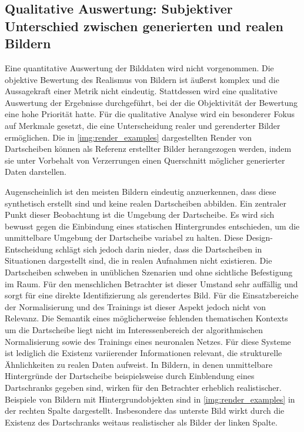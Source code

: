 \subsection[Qualitative Auswertung]{Qualitative Auswertung: Subjektiver Unterschied zwischen generierten und realen Bildern}  %
\label{sec:rendering_qualitativ}

Eine quantitative Auswertung der Bilddaten wird nicht vorgenommen. Die objektive Bewertung des Realismus von Bildern ist äußerst komplex und die Aussagekraft einer Metrik nicht eindeutig. Stattdessen wird eine qualitative Auswertung der Ergebnisse durchgeführt, bei der die Objektivität der Bewertung eine hohe Priorität hatte. Für die qualitative Analyse wird ein besonderer Fokus auf Merkmale gesetzt, die eine Unterscheidung realer und gerenderter Bilder ermöglichen. Die in \autoref{img:render_examples} dargestellten Render von Dartscheiben können als Referenz erstellter Bilder herangezogen werden, indem sie unter Vorbehalt von Verzerrungen einen Querschnitt möglicher generierter Daten darstellen.

Augenscheinlich ist den meisten Bildern eindeutig anzuerkennen, dass diese synthetisch erstellt sind und keine realen Dartscheiben abbilden. Ein zentraler Punkt dieser Beobachtung ist die Umgebung der Dartscheibe. Es wird sich bewusst gegen die Einbindung eines statischen Hintergrundes entschieden, um die unmittelbare Umgebung der Dartscheibe variabel zu halten. Diese Design-Entscheidung schlägt sich jedoch darin nieder, dass die Dartscheiben in Situationen dargestellt sind, die in realen Aufnahmen nicht existieren. Die Dartscheiben schweben in unüblichen Szenarien und ohne sichtliche Befestigung im Raum. Für den menschlichen Betrachter ist dieser Umstand sehr auffällig und sorgt für eine direkte Identifizierung als gerendertes Bild. Für die Einsatzbereiche der Normalisierung und des Trainings ist dieser Aspekt jedoch nicht von Relevanz. Die Semantik eines möglicherweise fehlenden thematischen Kontexts um die Dartscheibe liegt nicht im Interessenbereich der algorithmischen Normalisierung sowie des Trainings eines neuronalen Netzes. Für diese Systeme ist lediglich die Existenz variierender Informationen relevant, die strukturelle Ähnlichkeiten zu realen Daten aufweist. In Bildern, in denen unmittelbare Hintergründe der Dartscheibe beispielsweise durch Einblendung eines Dartschranks gegeben sind, wirken für den Betrachter erheblich realistischer. Beispiele von Bildern mit Hintergrundobjekten sind in \autoref{img:render_examples} in der rechten Spalte dargestellt. Insbesondere das unterste Bild wirkt durch die Existenz des Dartschranks weitaus realistischer als Bilder der linken Spalte.

